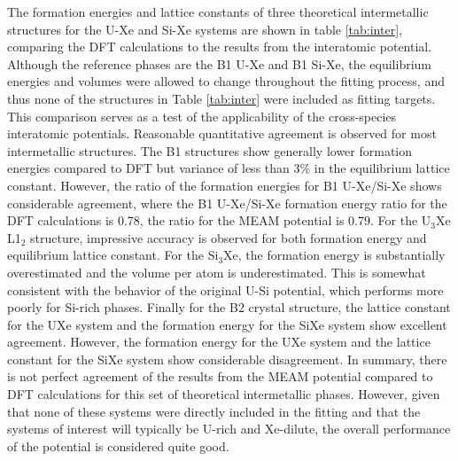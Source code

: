 \documentclass[review]{elsarticle}
\begin{document}
The formation energies and lattice constants of three theoretical intermetallic structures for the U-Xe and Si-Xe systems are shown in table \ref{tab:inter}, comparing the DFT calculations to the results from the interatomic potential. Although the reference phases are the B1 U-Xe and B1 Si-Xe, the equilibrium energies and volumes were allowed to change throughout the fitting process, and thus none of the structures in Table \ref{tab:inter} were included as fitting targets. This comparison serves as a test of the applicability of the cross-species interatomic potentials. Reasonable quantitative agreement is observed for most intermetallic structures. The B1 structures show generally lower formation energies compared to DFT but variance of less than 3\% in the equilibrium lattice constant. However, the ratio of the formation energies for B1 U-Xe/Si-Xe shows considerable agreement, where the B1 U-Xe/Si-Xe formation energy ratio for the DFT calculations is 0.78, the ratio for the MEAM potential is 0.79. For the U$_3$Xe L1$_2$ structure, impressive accuracy is observed for both formation energy and equilibrium lattice constant. For the Si$_3$Xe, the formation energy is substantially overestimated and the volume per atom is underestimated. This is somewhat consistent with the behavior of the original U-Si potential, which performs more poorly for Si-rich phases. Finally for the B2 crystal structure, the lattice constant for the UXe system and the formation energy for the SiXe system show excellent agreement. However, the formation energy for the UXe system and the lattice constant for the SiXe system show considerable disagreement. In summary, there is not perfect agreement of the results from the MEAM potential compared to DFT calculations for this set of theoretical intermetallic phases. However, given that none of these systems were directly included in the fitting and that the systems of interest will typically be U-rich and Xe-dilute, the overall performance of the potential is considered quite good. 
 
 
\end{document}
